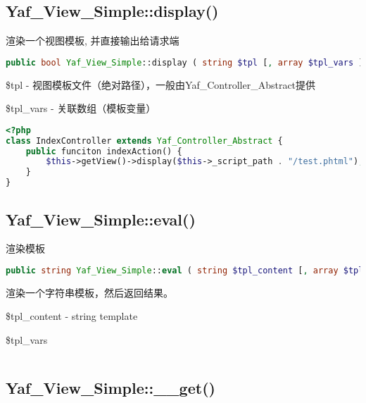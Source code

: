 \subsection{Yaf\_View\_Simple::display()}


渲染一个视图模板, 并直接输出给请求端

\begin{lstlisting}[language=PHP]
public bool Yaf_View_Simple::display ( string $tpl [, array $tpl_vars ] )
\end{lstlisting}

\begin{compactitem}
\item \$tpl - 视图模板文件（绝对路径），一般由Yaf\_Controller\_Abstract提供
\item \$tpl\_vars - 关联数组（模板变量）
\end{compactitem}

\begin{lstlisting}[language=PHP]
<?php
class IndexController extends Yaf_Controller_Abstract {
    public funciton indexAction() {
        $this->getView()->display($this->_script_path . "/test.phtml");
    }
}
\end{lstlisting}

\subsection{Yaf\_View\_Simple::eval()}

渲染模板

\begin{lstlisting}[language=PHP]
public string Yaf_View_Simple::eval ( string $tpl_content [, array $tpl_vars ] )
\end{lstlisting}

渲染一个字符串模板，然后返回结果。

\begin{compactitem}
\item \$tpl\_content - string template
\item \$tpl\_vars
\end{compactitem}



\begin{lstlisting}[language=PHP]

\end{lstlisting}

\subsection{Yaf\_View\_Simple::\_\_get()}

